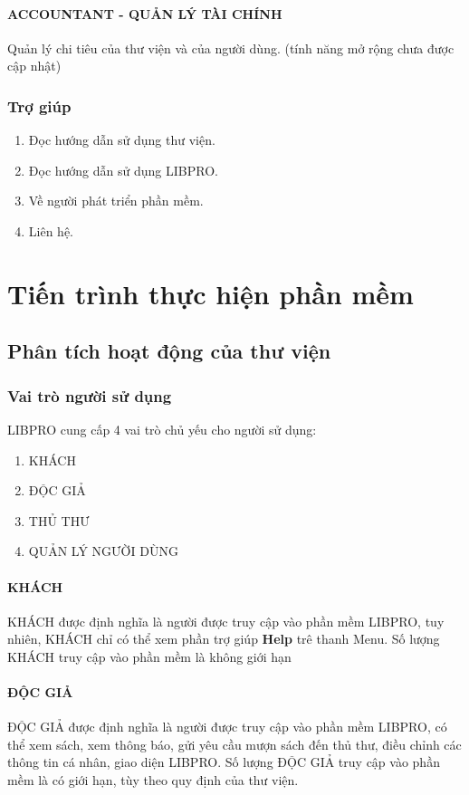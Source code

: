\documentclass[12pt,a4paper]{report}
\begin{document}
			\subsubsection{ACCOUNTANT - QUẢN LÝ TÀI CHÍNH}
			Quản lý chi tiêu của thư viện và của người dùng. (tính năng mở rộng chưa được cập nhật)
		\subsection{Trợ giúp}
			\begin{enumerate}
				\item Đọc hướng dẫn sử dụng thư viện.
				\item Đọc hướng dẫn sử dụng LIBPRO.
				\item Về người phát triển phần mềm.
				\item Liên hệ.
			\end{enumerate}
\chapter{Tiến trình thực hiện phần mềm}
	\section{Phân tích hoạt động của thư viện}
		\subsection{Vai trò người sử dụng}
		LIBPRO cung cấp 4 vai trò chủ yếu cho người sử dụng:
		\begin{enumerate}
			\item KHÁCH
			\item ĐỘC GIẢ
			\item THỦ THƯ
			\item QUẢN LÝ NGƯỜI DÙNG
		\end{enumerate}
			\subsubsection{KHÁCH}
				KHÁCH được định nghĩa là người được truy cập vào phần mềm LIBPRO, tuy nhiên, KHÁCH chỉ có thể xem phần trợ giúp \textbf{Help} trê thanh Menu. Số lượng KHÁCH truy cập vào phần mềm là không giới hạn
			\subsubsection{ĐỘC GIẢ}
				ĐỘC GIẢ được định nghĩa là người được truy cập vào phần mềm LIBPRO, có thể xem sách, xem thông báo, gửi yêu cầu mượn sách đến thủ thư, điều chỉnh các thông tin cá nhân, giao diện LIBPRO.
				Số lượng ĐỘC GIẢ truy cập vào phần mềm là có giới hạn, tùy theo quy định của thư viện.
\end{document}
